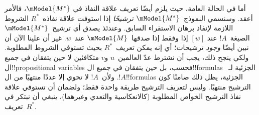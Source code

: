 \documentclass[../../../include/open-logic-section]{subfiles}
\begin{document}
أما في الحالة العامة، حيث يلزم أيضًا تعريف علاقة النفاذ في
$\mModel{M^*}$، فالأمر أعقد. وسنسمي النموذج~$\mModel{M^*}$
\emph{ترشيحًا} إذا استوفت علاقة نفاذه~$R^*$ الشروط اللازمة لإنفاذ برهان
الاستقراء السابق. وعندئذ يصدق أي ترشيح~$\mModel{M^*}$ الصيغة~$!A$ عند
$[w]$ إذا وفقط إذا صدقها~$\mModel{M}$ عند~$w$. غير أن علينا الآن أن
نبين أيضًا \emph{وجود} ترشيحات؛ أي إنه يمكن تعريف~$R^*$ بحيث تستوفي
الشروط المطلوبة. ولكي ينجح ذلك، يجب أن نشترط عدّ العالمين~$u$ و$v$
متكافئين لا حين يتفقان في جميع ال!!{propositional variable}s فحسب، بل
حين يتفقان في جميع ال!!{formula}s الجزئية لـ~$!A$. ولأن~$!A$ لا تحوي
إلا عددًا منتهيًا من ال!!{formula}s الجزئية، يظل ذلك ضامنًا كون الترشيح
منتهيًا. وليس لتعريف الترشيح طريقة واحدة فقط؛ ولضمان أن تستوفي علاقة نفاذ
الترشيح الخواص المطلوبة (كالانعكاسية والتعدي وغيرهما)، ينبغي أن نبتكر في
تعريف~$R^*$.
\end{document}

